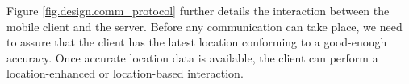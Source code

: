 \noindent Figure \ref{fig.design.comm_protocol} further details the interaction between the mobile client and the server. Before any communication can take place, we need to assure that the client has the latest location conforming to a good-enough accuracy. Once accurate location data is available, the client can perform a location-enhanced or location-based interaction.
